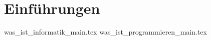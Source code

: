\part{Einführungen}
\label{part:einfuehrungen}

{was_ist_informatik_main.tex}
{was_ist_programmieren_main.tex}